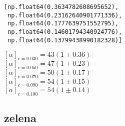 \documentclass[11pt]{article}
\makeatletter
\newcommand{\boxspacing}{\kern\kvtcb@left@rule\kern\kvtcb@boxsep}
\newcommand{\prompt}[4]{
        {\ttfamily\llap{{\color{#2}[#3]:\hspace{3pt}#4}}\vspace{-\baselineskip}}
    }
\makeatother
\begin{document}
            \begin{tcolorbox}[breakable, size=fbox, boxrule=.5pt, pad at break*=1mm, opacityfill=0]
\prompt{Out}{outcolor}{277}{\boxspacing}
\begin{Verbatim}[commandchars=\\\{\}]
[np.float64(0.3634782608695652),
 np.float64(0.23162640901771336),
 np.float64(0.1777639751552795),
 np.float64(0.14601794340924776),
 np.float64(0.13799438990182328)]
\end{Verbatim}
\end{tcolorbox}
        
    \([\alpha]_{c=0.030} = 43\left(1 \pm 0.36\right)\)\\
\([\alpha]_{c=0.050} = 47\left(1 \pm 0.23\right)\)\\
\([\alpha]_{c=0.070} = 50\left(1 \pm 0.17\right)\)\\
\([\alpha]_{c=0.090} = 54\left(1 \pm 0.15\right)\)\\
\([\alpha]_{c=0.100} = 54\left(1 \pm 0.14\right)\)

    \hypertarget{zelena}{%
\subsection{zelena}\label{zelena}}
\end{document}
